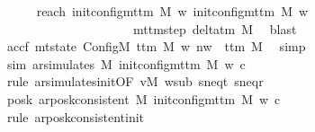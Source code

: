 \begin{isabellebody}
\ \ \ \ \isamarkupfalse%
\ reach{}{\isacharcolon}{\kern0pt}\ {\isachardoublequoteopen}{\isacharparenleft}{\kern0pt}init{\isacharunderscore}{\kern0pt}config{\isacharunderscore}{\kern0pt}mttm\ M\ w{\isacharcomma}{\kern0pt}\ init{\isacharunderscore}{\kern0pt}config{\isacharunderscore}{\kern0pt}mttm\ M\ w{\isacharparenright}{\kern0pt}\isanewline
\ \ \ \ \ \ \ \ \ \ \ \ \ \ \ \ \ \ \ \ {\isasymin}\ {\isacharparenleft}{\kern0pt}mttm{\isacharunderscore}{\kern0pt}step\ {\isacharparenleft}{\kern0pt}delta{\isacharunderscore}{\kern0pt}tm\ M{\isacharparenright}{\kern0pt}{\isacharparenright}{\kern0pt}\isactrlsup {\isacharasterisk}{\kern0pt}{\isachardoublequoteclose}\ \isamarkupfalse%
\ blast\isanewline
\ \ \ \ \isamarkupfalse%
\ accf{\isacharcolon}{\kern0pt}\ {\isachardoublequoteopen}mt{\isacharunderscore}{\kern0pt}state\ {\isacharparenleft}{\kern0pt}Config\isactrlsub M\ {\isacharparenleft}{\kern0pt}t{\isacharunderscore}{\kern0pt}tm\ M{\isacharparenright}{\kern0pt}\ w{\isacharprime}{\kern0pt}\ nw{\isacharparenright}{\kern0pt}\ {\isacharequal}{\kern0pt}\ t{\isacharunderscore}{\kern0pt}tm\ M{\isachardoublequoteclose}\ \isamarkupfalse%
\ simp\isanewline
\ \ \ \ \isamarkupfalse%
\ sim{\isacharcolon}{\kern0pt}\ {\isachardoublequoteopen}ar{\isacharunderscore}{\kern0pt}simulates\ M\ {\isacharparenleft}{\kern0pt}init{\isacharunderscore}{\kern0pt}config{\isacharunderscore}{\kern0pt}mttm\ M\ w{\isacharparenright}{\kern0pt}\ {\isacharquery}{\kern0pt}c{\isacharprime}{\kern0pt}{\isachardoublequoteclose}\isanewline
\ \ \ \ \ \ \isamarkupfalse%
\ {\isacharparenleft}{\kern0pt}rule\ ar{\isacharunderscore}{\kern0pt}simulates{\isacharunderscore}{\kern0pt}init{\isacharbrackleft}{\kern0pt}OF\ vM\ w{\isacharunderscore}{\kern0pt}sub\ s{\isacharunderscore}{\kern0pt}neq{\isacharunderscore}{\kern0pt}t\ s{\isacharunderscore}{\kern0pt}neq{\isacharunderscore}{\kern0pt}r{\isacharbrackright}{\kern0pt}{\isacharparenright}{\kern0pt}\isanewline
\ \ \ \ \isamarkupfalse%
\ posk{\isacharcolon}{\kern0pt}\ {\isachardoublequoteopen}ar{\isacharunderscore}{\kern0pt}posk{\isacharunderscore}{\kern0pt}consistent\ M\ {\isacharparenleft}{\kern0pt}init{\isacharunderscore}{\kern0pt}config{\isacharunderscore}{\kern0pt}mttm\ M\ w{\isacharparenright}{\kern0pt}\ {\isacharquery}{\kern0pt}c{\isacharprime}{\kern0pt}{\isachardoublequoteclose}\isanewline
\ \ \ \ \ \ \isamarkupfalse%
\ {\isacharparenleft}{\kern0pt}rule\ ar{\isacharunderscore}{\kern0pt}posk{\isacharunderscore}{\kern0pt}consistent{\isacharunderscore}{\kern0pt}init{\isacharparenright}{\kern0pt}\isanewline

\end{isabellebody}
